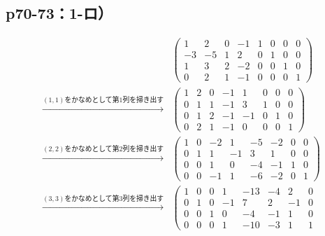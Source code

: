 \documentclass[uplatex,dvipdfmx,a4paper,11pt,fleqn]{jsarticle}
\begin{document}
\subsection*{p70-73：1-ロ）}
        \begin{leftbar}
        \begin{align*} 
        &
        \left( 
            \begin{array}{cccc|cccc}
            1 & 2 & 0 & -1 & 1 & 0 & 0 & 0\\ 
            -3 & -5 & 1 & 2 & 0 & 1 & 0 & 0 \\ 
            1 & 3 & 2 & -2 & 0 & 0 & 1 & 0 \\
            0 & 2 & 1 & -1 & 0 & 0 & 0 & 1 
            \end{array}
            \right) \\
           \xrightarrow{\text{$(1,1)$をかなめとして第$1$列を掃き出す}} &
            \left( \begin{array}{cccc|cccc}
            1 & 2 & 0 & -1 & 1 & 0 & 0 & 0\\ 
            0 & 1 & 1 & -1 & 3 & 1 & 0 & 0 \\
            0 & 1 & 2 & -1 & -1 & 0 & 1 & 0 \\
            0 & 2 & 1 & -1 & 0 & 0 & 0 & 1 
            \end{array}
            \right) \\
           \xrightarrow{\text{$(2,2)$をかなめとして第$2$列を掃き出す}} &
           \left( \begin{array}{cccc|cccc}
            1 & 0 & -2 & 1 & -5 & -2 & 0 & 0\\ 
            0 & 1 & 1 & -1 & 3 & 1 & 0 & 0 \\
            0 & 0 & 1 & 0 & -4 & -1 & 1 & 0 \\
            0 & 0 & -1 & 1 & -6 & -2 & 0 & 1 
            \end{array}
            \right) \\
           \xrightarrow{\text{$(3,3)$をかなめとして第$3$列を掃き出す}} &
           \left( \begin{array}{cccc|cccc}
            1 & 0 & 0 & 1 & -13 & -4 & 2 & 0\\ 
            0 & 1 & 0 & -1 & 7 & 2 & -1 & 0 \\
            0 & 0 & 1 & 0 & -4 & -1 & 1 & 0 \\
            0 & 0 & 0 & 1 & -10 & -3 & 1 & 1 
            \end{array}

\end{align*}
\end{leftbar}
\end{document}
